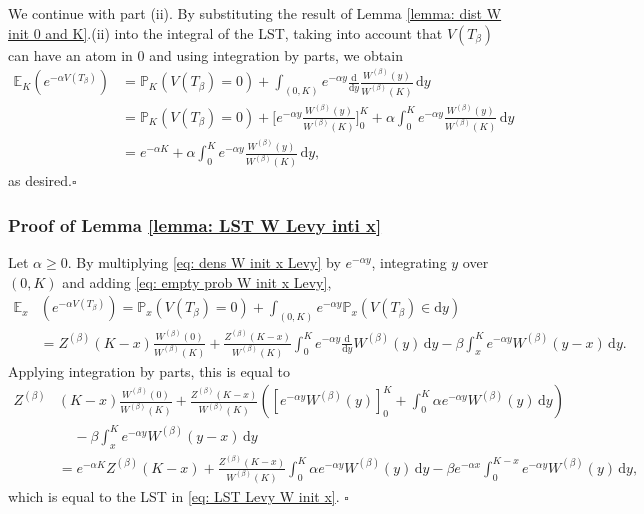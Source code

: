 \documentclass[reqno,12pt]{amsart}
\begin{document}
{We continue with part (ii). By substituting the result of Lemma \ref{lemma: dist W init 0 and K}.(ii) into the integral of the LST, taking into account that $V(T_\beta)$ can have an atom in $0$ and using integration by parts, we obtain 
\begin{align*}
    \mathbb{E}_K\left(e^{-\alpha V(T_\beta)}\right) &= \mathbb{P}_K\left(V(T_\beta) = 0\right) + \int_{(0,K)} e^{-\alpha y}\frac{\mathrm{d}}{\mathrm{d}y}\frac{W^{(\beta)}(y)}{W^{(\beta)}(K)}\,\mathrm{d}y \\
    &= \mathbb{P}_K\left(V(T_\beta) = 0\right) + \Big[e^{-\alpha y}\frac{W^{(\beta)}(y)}{W^{(\beta)}(K)}\Big]_0^K + \alpha\int_0^K e^{-\alpha y} \frac{W^{(\beta)}(y)}{W^{(\beta)}(K)}\,\mathrm{d}y \\
    &= e^{-\alpha K} + \alpha\int_0^K e^{-\alpha y}\frac{W^{(\beta)}(y)}{W^{(\beta)}(K)}\,\mathrm{d}y,
\end{align*}
as desired.\hfill$\square$
\fi

\subsubsection*{Proof of Lemma \ref{lemma: LST W Levy inti x}}\label{app: proof LST Levy}
Let $\alpha\geqslant0$. By multiplying \eqref{eq: dens W init x Levy} by $e^{-\alpha y}$, integrating $y$ over $(0,K)$ and adding \eqref{eq: empty prob W init x Levy},
\begin{align*}
    \mathbb{E}_x&\left(e^{-\alpha V(T_\beta)}\right) = \mathbb{P}_x\left(V(T_\beta) = 0\right) + \int_{(0,K)}e^{-\alpha y}\mathbb{P}_x\left(V(T_\beta)\in\mathrm{d}y\right) \\
    &= Z^{(\beta)}(K-x)\frac{W^{(\beta)}(0)}{W^{(\beta)}(K)} + \frac{Z^{(\beta)}(K-x)}{W^{(\beta)}(K)}\int_0^K e^{-\alpha y}\frac{\mathrm{d}}{\mathrm{d}y}W^{(\beta)}(y)\,\mathrm{d}y -\beta\int_x^K e^{-\alpha y}W^{(\beta)}(y-x)\,\mathrm{d}y.
\end{align*}
Applying integration by parts, this is equal to
\begin{align*}
    Z^{(\beta)}&(K-x)\frac{W^{(\beta)}(0)}{W^{(\beta)}(K)} + \frac{Z^{(\beta)}(K-x)}{W^{(\beta)}(K)}\left(\left[e^{-\alpha y}W^{(\beta)}(y)\right]_0^K+\int_0^K \alpha e^{-\alpha y}W^{(\beta)}(y)\,\mathrm{d}y\right) \\
    &\:\:\:\:\:-\beta\int_x^K e^{-\alpha y}W^{(\beta)}(y-x)\,\mathrm{d}y\\
    &= e^{-\alpha K}Z^{(\beta)}(K-x) + \frac{Z^{(\beta)}(K-x)}{W^{(\beta)}(K)}\int_0^K \alpha e^{-\alpha y}W^{(\beta)}(y)\,\mathrm{d}y -\beta e^{-\alpha x}\int_0^{K-x} e^{-\alpha y}W^{(\beta)}(y)\,\mathrm{d}y,
\end{align*}
which is equal to the LST in \eqref{eq: LST Levy W init x}. \hfill$\square$


}
\end{document}
